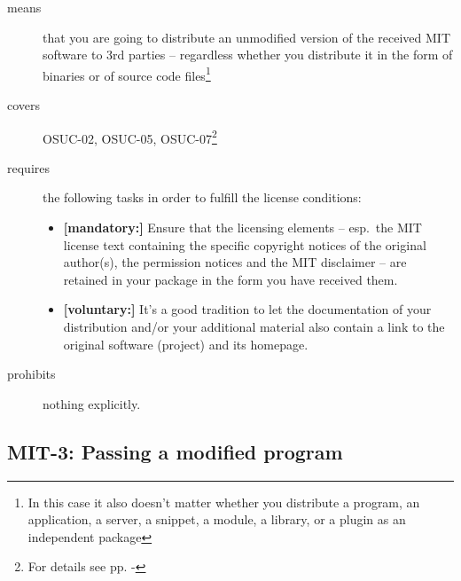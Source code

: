 \begin{description}
\item[means] that you are going to distribute an unmodified version of the
received MIT software to 3rd parties -- regardless whether you distribute it in
the form of binaries or of source code files\footnote{In this case it also doesn't
matter whether you distribute a program, an application, a server, a snippet, a
module, a library, or a plugin as an independent package}

\item[covers] OSUC-02, OSUC-05, OSUC-07\footnote{For details see pp.
\pageref{OSUC-02-DEF} - \pageref{OSUC-07-DEF}}

\item[requires] the following tasks in order to fulfill the license conditions:
\begin{itemize}
  \item \textbf{[mandatory:]} Ensure that the licensing elements -- esp.\
  the MIT license text containing the specific copyright notices of the original
  author(s), the permission notices and the MIT disclaimer -- are retained in
  your package in the form you have received them.
  \item \textbf{[voluntary:]} It's a good tradition to let the documentation of
  your distribution and/or your additional material also contain a link to the
  original software (project) and its homepage.
\end{itemize}
\item[prohibits] nothing explicitly.
\end{description}

\subsection{MIT-3: Passing a modified program}
\label{OSUC-04-MIT}

